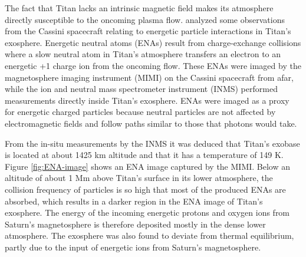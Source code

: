 \documentclass[12pt, parskip=full*, abstract]{scrartcl}
\begin{document}

The fact that Titan lacks an intrinsic magnetic field makes its atmosphere directly susceptible to the oncoming plasma flow. \textcite{titan-exosphere-interaction} analyzed some observations from the Cassini spacecraft relating to energetic particle interactions in Titan's exosphere. Energetic neutral atoms (ENAs) result from charge-exchange collisions where a slow neutral atom in Titan's atmosphere transfers an electron to an energetic +1 charge ion from the oncoming flow. These ENAs were imaged by the magnetosphere imaging instrument (MIMI) on the Cassini spacecraft from afar, while the ion and neutral mass spectrometer instrument (INMS) performed measurements directly inside Titan's exosphere. ENAs were imaged as a proxy for energetic charged particles because neutral particles are not affected by electromagnetic fields and follow paths similar to those that photons would take. 

From the in-situ measurements by the INMS it was deduced that Titan's exobase is located at about 1425 km altitude and that it has a temperature of 149 K. Figure \ref{fig:ENA-image} shows an ENA image captured by the MIMI. Below an altitude of about 1 Mm above Titan's surface in its lower atmosphere, the collision frequency of particles is so high that most of the produced ENAs are absorbed, which results in a darker region in the ENA image of Titan's exosphere. The energy of the incoming energetic protons and oxygen ions from Saturn's magnetosphere is therefore deposited mostly in the dense lower atmosphere. The exosphere was also found to deviate from thermal equilibrium, partly due to the input of energetic ions from Saturn's magnetosphere.
\end{document}
